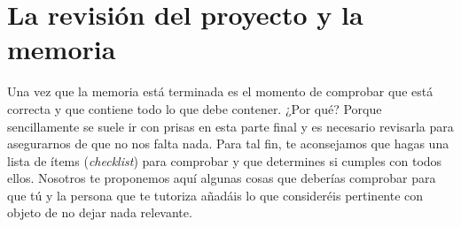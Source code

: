 \chapter{La revisión del proyecto y la memoria}
\label{cap:Revisión}


Una vez que la memoria está terminada es el momento de comprobar que está correcta y que contiene todo lo que debe contener. ¿Por qué? Porque sencillamente se suele ir con prisas en esta parte final y es necesario revisarla para asegurarnos de que no nos falta nada. Para tal fin, te aconsejamos que hagas una lista de ítems ({\it checklist}) para comprobar y que determines si cumples con todos ellos. Nosotros te proponemos aquí algunas cosas que deberías comprobar para que tú y la persona que te tutoriza añadáis lo que consideréis pertinente con objeto de no dejar nada relevante.


